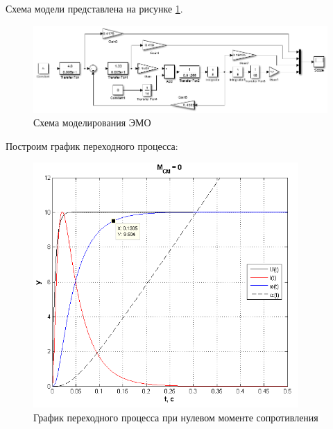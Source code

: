 \documentclass[fleqn, a4paper, 11pt, russian]{article}
\begin{document}
	Схема модели представлена на рисунке \ref{fullModel}.
	\begin{figure}[ht!]
		\centering
		\includegraphics[width = \textwidth]{fullModel}
		\caption{Схема моделирования ЭМО}
		\label{fullModel}
	\end{figure}
	\newpage
	Построим график переходного процесса:
	\begin{figure}[ht!]
		\centering
		\includegraphics[width = 0.9\textwidth]{M0}
		\caption{График переходного процесса при нулевом моменте сопротивления}
		\label{M0}
	\end{figure}
	\clearpage
\end{document}

